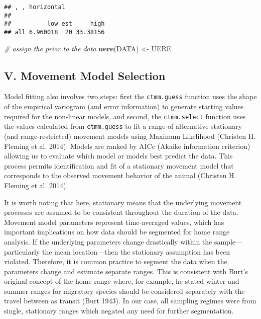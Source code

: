 \documentclass[
]{article}
\newenvironment{Shaded}{\begin{snugshade}}{\end{snugshade}}
\newcommand{\CommentTok}[1]{\textcolor[rgb]{0.56,0.35,0.01}{\textit{#1}}}
\newcommand{\FunctionTok}[1]{\textcolor[rgb]{0.13,0.29,0.53}{\textbf{#1}}}
\newcommand{\NormalTok}[1]{#1}
\newcommand{\OtherTok}[1]{\textcolor[rgb]{0.56,0.35,0.01}{#1}}
\begin{document}
\begin{verbatim}
## , , horizontal
## 
##          low est     high
## all 6.960018  20 33.38156
\end{verbatim}

\begin{Shaded}
\begin{Highlighting}[]
\CommentTok{\# assign the prior to the data}
\FunctionTok{uere}\NormalTok{(DATA) }\OtherTok{\textless{}{-}}\NormalTok{ UERE}
\end{Highlighting}
\end{Shaded}

\subsection{V. Movement Model
Selection}\label{v.-movement-model-selection}

Model fitting also involves two steps: first the \texttt{ctmm.guess}
function uses the shape of the empirical variogram (and error
information) to generate starting values required for the non-linear
models, and second, the \texttt{ctmm.select} function uses the values
calculated from \texttt{ctmm.guess} to fit a range of alternative
stationary (and range-restricted) movement models using Maximum
Likelihood (Christen H. Fleming et al. 2014). Models are ranked by AICc
(Akaike information criterion) allowing us to evaluate which model or
models best predict the data. This process permits identification and
fit of a stationary movement model that corresponds to the observed
movement behavior of the animal (Christen H. Fleming et al. 2014).

It is worth noting that here, stationary means that the underlying
movement processes are assumed to be consistent throughout the duration
of the data. Movement model parameters represent time-averaged values,
which has important implications on how data should be segmented for
home range analysis. If the underlying parameters change drastically
within the sample---particularly the mean location---then the stationary
assumption has been violated. Therefore, it is common practice to
segment the data when the parameters change and estimate separate
ranges. This is consistent with Burt's original concept of the home
range where, for example, he stated winter and summer ranges for
migratory species should be considered separately with the travel
between as transit (Burt 1943). In our case, all sampling regimes were
from single, stationary ranges which negated any need for further
segmentation.
\end{document}
